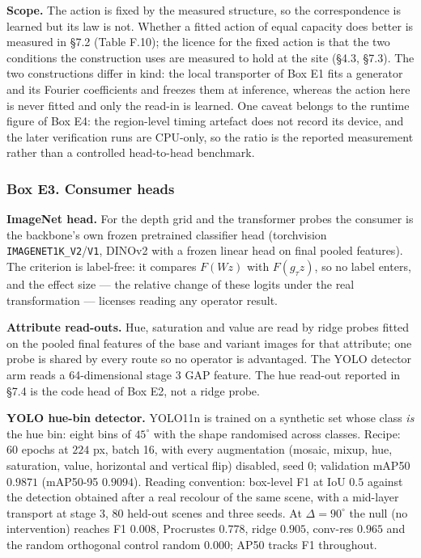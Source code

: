 \textbf{Scope.} The action is fixed by the measured structure, so the correspondence is learned but its law is not. Whether a fitted action of equal capacity does better is measured in \S{}7.2 (Table F.10); the licence for the fixed action is that the two conditions the construction uses are measured to hold at the site (\S{}4.3, \S{}7.3). The two constructions differ in kind: the local transporter of Box E1 fits a generator and its Fourier coefficients and freezes them at inference, whereas the action here is never fitted and only the read-in is learned. One caveat belongs to the runtime figure of Box E4: the region-level timing artefact does not record its device, and the later verification runs are CPU-only, so the ratio is the reported measurement rather than a controlled head-to-head benchmark.

\subsubsection*{Box E3. Consumer heads}

\textbf{ImageNet head.} For the depth grid and the transformer probes the consumer is the backbone's own frozen pretrained classifier head (torchvision \texttt{IMAGENET1K\_\allowbreak{}V2}/\texttt{V1}, DINOv2 with a frozen linear head on final pooled features). The criterion is label-free: it compares $F(Wz)$ with $F(g_\tau z)$, so no label enters, and the effect size --- the relative change of these logits under the real transformation --- licenses reading any operator result.

\textbf{Attribute read-outs.} Hue, saturation and value are read by ridge probes fitted on the pooled final features of the base and variant images for that attribute; one probe is shared by every route so no operator is advantaged. The YOLO detector arm reads a 64-dimensional stage 3 GAP feature. The hue read-out reported in \S{}7.4 is the code head of Box E2, not a ridge probe.

\textbf{YOLO hue-bin detector.} YOLO11n is trained on a synthetic set whose class \textit{is} the hue bin: eight bins of $45^\circ$ with the shape randomised across classes. Recipe: 60 epochs at $224$ px, batch 16, with every augmentation (mosaic, mixup, hue, saturation, value, horizontal and vertical flip) disabled, seed $0$; validation mAP50 $0.9871$ (mAP50-95 $0.9094$). Reading convention: box-level F1 at IoU $0.5$ against the detection obtained after a real recolour of the same scene, with a mid-layer transport at stage 3, 80 held-out scenes and three seeds. At $\Delta=90^\circ$ the null (no intervention) reaches F1 $0.008$, Procrustes $0.778$, ridge $0.905$, conv-res $0.965$ and the random orthogonal control random $0.000$; AP50 tracks F1 throughout.

